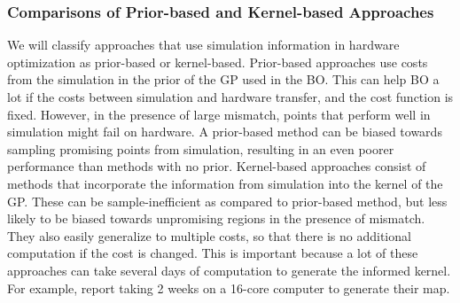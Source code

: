 \subsubsection{Comparisons of Prior-based and Kernel-based Approaches}
\label{subsec:sim_experiments_prior_cully}
We will classify approaches that use simulation information in hardware optimization as prior-based or kernel-based. Prior-based approaches use costs from the simulation in the prior of the GP used in the BO. This can help BO a lot if the costs between simulation and hardware transfer, and the cost function is fixed. However, in the presence of large mismatch, points that perform well in simulation might fail on hardware. A prior-based method can be biased towards sampling promising points from simulation, resulting in an even poorer performance than methods with no prior. Kernel-based approaches consist of methods that incorporate the information from simulation into the kernel of the GP. These can be sample-inefficient as compared to prior-based method, but less likely to be biased towards unpromising regions in the presence of mismatch. They also easily generalize to multiple costs, so that there is no additional computation if the cost is changed. This is important because a lot of these approaches can take several days of computation to generate the informed kernel. For example, \cite{cully2015robots} report taking 2 weeks on a 16-core computer to generate their map. 
